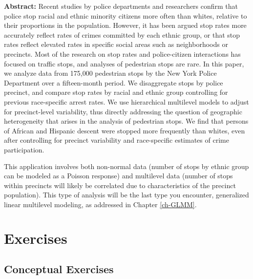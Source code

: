 \documentclass[
]{krantz}
\renewenvironment{quote}{\begin{VF}}{\end{VF}}
\begin{document}
\begin{quote}
\textbf{Abstract:} Recent studies by police departments and researchers confirm that police stop racial and ethnic minority citizens more often than whites, relative to their proportions in the population. However, it has been argued stop rates more accurately reflect rates of crimes committed by each ethnic group, or that stop rates reflect elevated rates in specific social areas such as neighborhoods or precincts. Most of the research on stop rates and police-citizen interactions has focused on traffic stops, and analyses of pedestrian stops are rare. In this paper, we analyze data from 175,000 pedestrian stops by the New York Police Department over a fifteen-month period. We disaggregate stops by police precinct, and compare stop rates by racial and ethnic group controlling for previous race-specific arrest rates. We use hierarchical multilevel models to adjust for precinct-level variability, thus directly addressing the question of geographic heterogeneity that arises in the analysis of pedestrian stops. We find that persons of African and Hispanic descent were stopped more frequently than whites, even after controlling for precinct variability and race-specific estimates of crime participation.
\end{quote}

This application involves both non-normal data (number of stops by ethnic group can be modeled as a Poisson response) and multilevel data (number of stops within precincts will likely be correlated due to characteristics of the precinct population). This type of analysis will be the last type you encounter, generalized linear multilevel modeling, as addressed in Chapter \ref{ch-GLMM}.

\hypertarget{exercises}{%
\section{Exercises}\label{exercises}}

\hypertarget{conceptual-exercises}{%
\subsection{Conceptual Exercises}\label{conceptual-exercises}}
\end{document}
